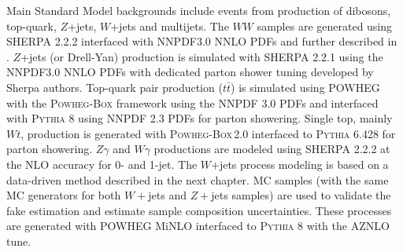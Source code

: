 %
%

Main Standard Model backgrounds include events from production of dibosons, top-quark, $Z$+jets, $W$+jets and multijets. The $WW$ samples are generated using \textsc{SHERPA} 2.2.2 interfaced with NNPDF3.0 NNLO PDFs and further described in \cite{Cascioli:2013gfa}. $Z$+jets (or Drell-Yan) production is simulated with \textsc{SHERPA} 2.2.1 using the NNPDF3.0 NNLO PDFs with dedicated parton shower tuning developed by Sherpa authors. Top-quark pair production ($t\bar{t}$) is simulated using \textsc{POWHEG} with the \textsc{Powheg-Box} framework using the NNPDF 3.0 PDFs and interfaced with \textsc{Pythia 8} using NNPDF 2.3 PDFs for parton showering. Single top, mainly $Wt$, production is generated with \textsc{Powheg-Box}\,2.0 interfaced to \textsc{Pythia} 6.428 for parton showering. $Z\gamma$ and $W\gamma$ productions are modeled using \textsc{SHERPA} 2.2.2 at the NLO accuracy for 0- and 1-jet. The $W$+jets process modeling is based on a data-driven method described in the next chapter. MC samples (with the same MC generators for both $W+$jets and $Z+$jets samples) are used to validate the fake estimation and estimate sample composition uncertainties. These processes are generated with \textsc{POWHEG} MiNLO interfaced to \textsc{Pythia 8} with the AZNLO tune. 

